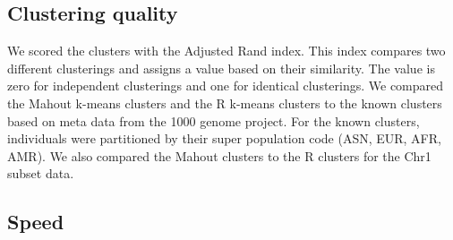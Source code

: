 \documentclass[twocolumn]{bmcart}%
\newcommand{\chrOnePop}{Chr1\_Population}
\begin{document}
\subsection*{Clustering quality}
We scored the clusters with the Adjusted Rand index. 
This index compares two different clusterings and assigns a value based on their similarity. The value is zero for independent clusterings and one for identical clusterings. We compared the Mahout k-means
clusters and the R k-means clusters to the known clusters based on meta data from the 1000 genome project. For the known clusters,
individuals were partitioned by their super population code (ASN, EUR, AFR, AMR). 
We also compared the Mahout clusters to the
R clusters for the Chr1 subset data.

\subsection*{Speed}



\end{document}
